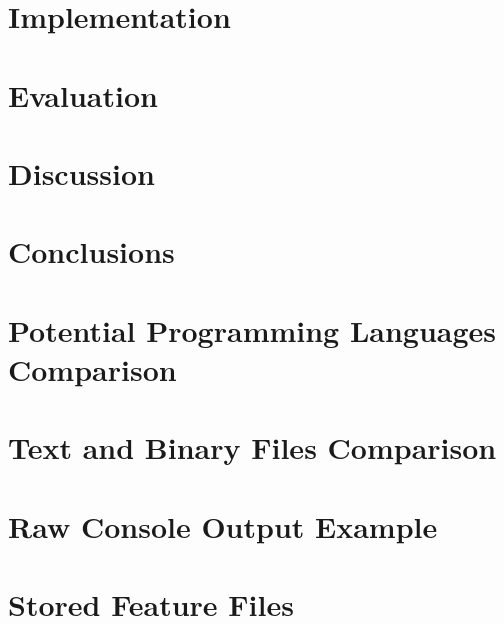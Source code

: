 \documentclass[11pt,openright,twoside,a4paper]{report}
\begin{document}
\chapter{Implementation}
\label{ch:chapter5}


\chapter{Evaluation}
\label{ch:chapter6}


\chapter{Discussion}
\label{ch:chapter7}


\chapter{Conclusions}
\label{ch:chapter8}




\let\cleardoublepage\clearpage %
\appendix

\chapter{Potential Programming Languages Comparison}
\label{ch:appendix-comparison-programming-languages}


\chapter{Text and Binary Files Comparison}
\label{ch:appendix-comparison-text-vs-binary}


\chapter{Raw Console Output Example}
\label{ch:appendix-raw-console-output-example}


\chapter{Stored Feature Files}
\label{ch:appendix-stored-feature-files}

\end{document}
